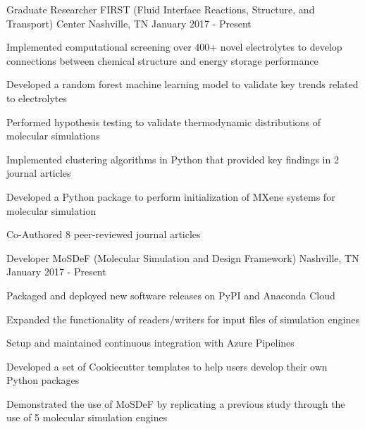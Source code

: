 
\begin{cventries}
  \cventry
    {Graduate Researcher} %
    {FIRST (Fluid Interface Reactions, Structure, and Transport) Center} %
    {Nashville, TN} %
    {January 2017 - Present} %
    {
      \begin{cvitems} %
        \item{Implemented computational screening over 400+ novel electrolytes to
        develop \newline
        connections between chemical structure and energy storage performance}
        \item {Developed a random forest machine learning model to validate key trends related to
            electrolytes}
        \item{Performed hypothesis testing to validate thermodynamic
            distributions of molecular simulations}
        \item {Implemented clustering algorithms in Python that
            provided key findings in 2 journal articles}
        \item {Developed a Python package to perform initialization of 
            MXene systems for molecular simulation}
        \item {Co-Authored 8 peer-reviewed journal articles}
      \end{cvitems}
    }

  \cventry
    {Developer} %
    {MoSDeF (Molecular Simulation and Design Framework)} %
    {Nashville, TN} %
    {January 2017 - Present} %
    {
      \begin{cvitems} %
      \item {Packaged and deployed new software releases on PyPI and Anaconda
          Cloud}
        \item {Expanded the functionality of readers/writers for input files of
            simulation engines}
        \item{Setup and maintained continuous integration with Azure Pipelines}
        \item{Developed a set of Cookiecutter templates to help users develop
            their own Python packages}
        \item{Demonstrated the use of MoSDeF by replicating a previous study
            through the use of 5 molecular simulation engines}
      \end{cvitems}
    }
\end{cventries}
